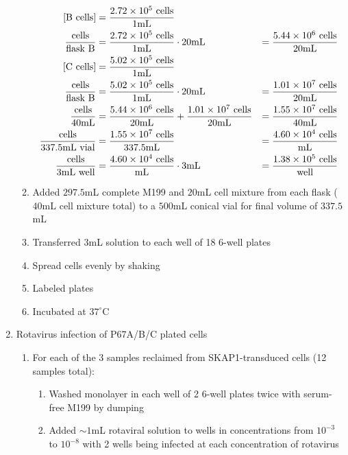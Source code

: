 \begin{enumerate}
\begin{enumerate}
				\begin{align*}
				\text{[B cells]} &= \frac{2.72\times 10^{5}\text{ cells}}{1\text{mL}} \\
				\frac{\text{cells}}{\text{flask B}} &= \frac{2.72\times 10^{5}\text{ cells}}{1\text{mL}} \cdot 20\text{mL} &= \frac{5.44\times 10^{6}\text{ cells}}{20\text{mL}}\\
				\text{[C cells]} &= \frac{5.02\times 10^{5}\text{ cells}}{1\text{mL}} \\
				\frac{\text{cells}}{\text{flask B}} &= \frac{5.02\times 10^{5}\text{ cells}}{1\text{mL}} \cdot 20\text{mL} &= \frac{1.01\times 10^{7}\text{ cells}}{20\text{mL}}\\
				\frac{\text{cells}}{\text{40\text{mL}}} &=
				\frac{5.44\times 10^{6}\text{ cells}}{20\text{mL}}+\frac{1.01\times 10^{7}\text{ cells}}{20\text{mL}} &=
				\frac{1.55\times 10^{7}\text{ cells}}{40\text{mL}}\\
				\frac{\text{cells}}{337.5\text{mL vial}} &= \frac{1.55\times 10^{7}\text{ cells}}{337.5\text{mL}} &= \frac{4.60\times 10^{4}\text{ cells}}{\text{mL}}\\
				\frac{\text{cells}}{3\text{mL well}} &= \frac{4.60\times 10^{4}\text{ cells}}{\text{mL}} \cdot 3\text{mL} &= \frac{1.38\times 10^{5}\text{ cells}}{\text{well}}\\
				\end{align*}
			\item Added $297.5$mL complete M199 and $20$mL cell mixture from each flask ($40$mL cell mixture total) to a $500$mL conical vial for final volume of $337.5$mL
			\item Transferred $3$mL solution to each well of 18 6-well plates
			\item Spread cells evenly by shaking
			\item Labeled plates
			\item Incubated at $37^{\circ}$C
		\end{enumerate}
	\item Rotavirus infection of P67A/B/C plated cells
		\begin{enumerate}
			\item For each of the 3 samples reclaimed from SKAP1-transduced cells (12 samples total):
				\begin{enumerate}
					\item Washed monolayer in each well of 2 6-well plates twice with serum-free M199 by dumping
					\item Added $\sim 1$mL rotaviral solution to wells in concentrations from $10^{-3}$ to $10^{-8}$ with 2 wells being infected at each concentration of rotavirus

\end{enumerate}
\end{enumerate}
\end{enumerate}
